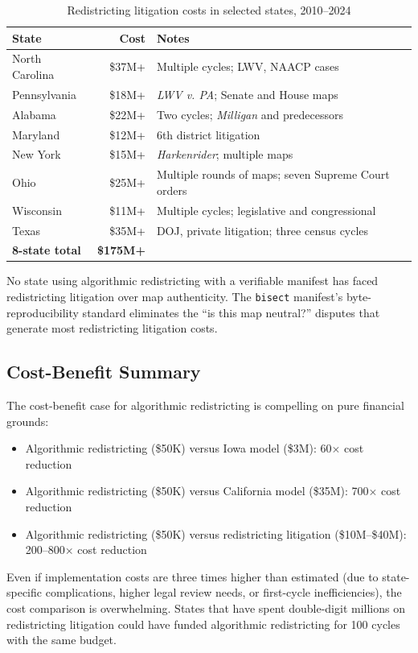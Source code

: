 \begin{table}[h]
\centering
\caption{Redistricting litigation costs in selected states, 2010--2024}
\label{tab:litigation-costs}
\begin{tabular}{@{}lrl@{}}
\toprule
State & Cost & Notes \\
\midrule
North Carolina & \$37M+ & Multiple cycles; LWV, NAACP cases \\
Pennsylvania   & \$18M+ & \textit{LWV v. PA}; Senate and House maps \\
Alabama        & \$22M+ & Two cycles; \textit{Milligan} and predecessors \\
Maryland       & \$12M+ & 6th district litigation \\
New York       & \$15M+ & \textit{Harkenrider}; multiple maps \\
Ohio           & \$25M+ & Multiple rounds of maps; seven Supreme Court orders \\
Wisconsin      & \$11M+ & Multiple cycles; legislative and congressional \\
Texas          & \$35M+ & DOJ, private litigation; three census cycles \\
\midrule
\textbf{8-state total} & \textbf{\$175M+} & \\
\bottomrule
\end{tabular}
\end{table}

No state using algorithmic redistricting with a verifiable manifest has faced redistricting litigation over map authenticity. The \texttt{bisect} manifest's byte-reproducibility standard eliminates the ``is this map neutral?'' disputes that generate most redistricting litigation costs.

\subsection{Cost-Benefit Summary}

The cost-benefit case for algorithmic redistricting is compelling on pure financial grounds:

\begin{itemize}
  \item Algorithmic redistricting (\$50K) versus Iowa model (\$3M): 60$\times$ cost reduction
  \item Algorithmic redistricting (\$50K) versus California model (\$35M): 700$\times$ cost reduction
  \item Algorithmic redistricting (\$50K) versus redistricting litigation (\$10M--\$40M): 200--800$\times$ cost reduction
\end{itemize}

Even if implementation costs are three times higher than estimated (due to state-specific complications, higher legal review needs, or first-cycle inefficiencies), the cost comparison is overwhelming. States that have spent double-digit millions on redistricting litigation could have funded algorithmic redistricting for 100 cycles with the same budget.
